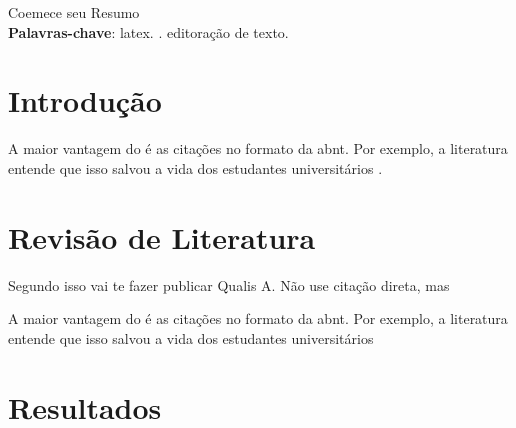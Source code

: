 \documentclass[
	article,
	12pt,
	oneside,
	a4paper,
	english,
	brazil
	]{abntex2}
\begin{document}
\maketitle



\begin{resumoumacoluna}
 Coemece seu Resumo\\
 
 \textbf{Palavras-chave}: latex. \abnTeX. editoração de texto.
\end{resumoumacoluna}

\textual
\section{Introdução}

A maior vantagem do \abnTeX é as citações no formato da abnt. Por exemplo, a literatura entende que isso salvou a vida dos estudantes universitários \cite{Abreu1999}. 

\section{Revisão de Literatura}
Segundo  isso vai te fazer publicar Qualis A. Não use citação direta, mas

\begin{citacao}
A maior vantagem do \abnTeX é as citações no formato da abnt. Por exemplo, a literatura entende que isso salvou a vida dos estudantes universitários \cite{Abreu1999}
\end{citacao}


\section{Resultados}



\end{document}
